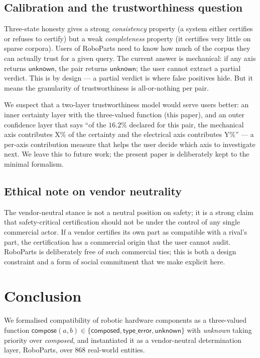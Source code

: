\documentclass[review]{elsarticle}
\begin{document}
\subsection{Calibration and the trustworthiness question}

Three-state honesty gives a strong \emph{consistency} property
(a system either certifies or refuses to certify) but a weak
\emph{completeness} property (it certifies very little on sparse
corpora). Users of RoboParts need to know how much of the corpus
they can actually trust for a given query. The current answer is
mechanical: if any axis returns $\mathsf{unknown}$, the pair
returns $\mathsf{unknown}$; the user cannot extract a partial
verdict. This is by design — a partial verdict is where false
positives hide. But it means the granularity of trustworthiness
is all-or-nothing per pair.

We suspect that a two-layer trustworthiness model would serve
users better: an inner certainty layer with the three-valued
function (this paper), and an outer confidence layer that says
``of the $16.2\%$ declared for this pair, the mechanical axis
contributes X\% of the certainty and the electrical axis
contributes Y\%'' --- a per-axis contribution measure that helps
the user decide which axis to investigate next. We leave this to
future work; the present paper is deliberately kept to the
minimal formalism.

\subsection{Ethical note on vendor neutrality}

The vendor-neutral stance is not a neutral position on safety;
it is a strong claim that safety-critical certification should
not be under the control of any single commercial actor. If a
vendor certifies its own part as compatible with a rival's part,
the certification has a commercial origin that the user cannot
audit. RoboParts is deliberately free of such commercial ties;
this is both a design constraint and a form of social commitment
that we make explicit here.

\section{Conclusion}

We formalised compatibility of robotic hardware components as a
three-valued function
$\mathsf{compose}(a, b) \in \{\mathsf{composed}, \mathsf{type\_error},
\mathsf{unknown}\}$ with \emph{unknown} taking priority over
\emph{composed}, and instantiated it as a vendor-neutral determination
layer, RoboParts, over $868$ real-world entities.
\end{document}

